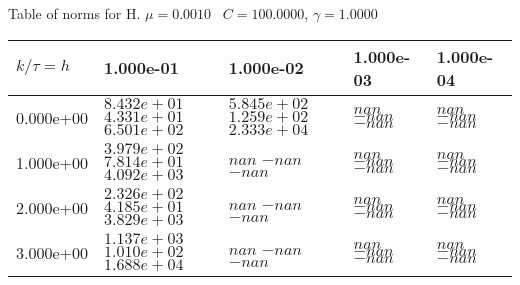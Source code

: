 \begin{center}
Table of norms for H. $\mu = 0.0010$ \, $C = 100.0000$, $\gamma = 1.0000$
  
\begin{tabular}{|p{1in}|p{1in}|p{1in}|p{1in}|p{1in}|} \hline
$k / \tau = h$ &1.000e-01 &1.000e-02 &1.000e-03 &1.000e-04 \\ \hline 
0.000e+00 & $8.432e+01$  $4.331e+01$  $6.501e+02$  & $5.845e+02$  $1.259e+02$  $2.333e+04$  & $nan$  $-nan$  $-nan$  & $nan$  $-nan$  $-nan$  \\ \hline 
1.000e+00 & $3.979e+02$  $7.814e+01$  $4.092e+03$  & $nan$  $-nan$  $-nan$  & $nan$  $-nan$  $-nan$  & $nan$  $-nan$  $-nan$  \\ \hline 
2.000e+00 & $2.326e+02$  $4.185e+01$  $3.829e+03$  & $nan$  $-nan$  $-nan$  & $nan$  $-nan$  $-nan$  & $nan$  $-nan$  $-nan$  \\ \hline 
3.000e+00 & $1.137e+03$  $1.010e+02$  $1.688e+04$  & $nan$  $-nan$  $-nan$  & $nan$  $-nan$  $-nan$  & $nan$  $-nan$  $-nan$  \\ \hline 

\end{tabular}\\[20pt]
\end{center}
